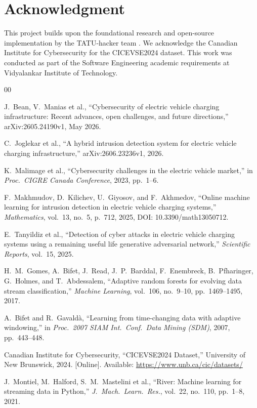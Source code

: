 \documentclass[conference]{IEEEtran}
\begin{document}
\section*{Acknowledgment}

This project builds upon the foundational research and open-source implementation by the TATU-hacker team \cite{b4}. We acknowledge the Canadian Institute for Cybersecurity for the CICEVSE2024 dataset. This work was conducted as part of the Software Engineering academic requirements at Vidyalankar Institute of Technology.

\begin{thebibliography}{00}

 J.\ Bean, V.\ Manias et al., ``Cybersecurity of electric vehicle charging infrastructure: Recent advances, open challenges, and future directions,'' arXiv:2605.24190v1, May 2026.

 C.\ Joglekar et al., ``A hybrid intrusion detection system for electric vehicle charging infrastructure,'' arXiv:2606.23236v1, 2026.

 K.\ Malimage et al., ``Cybersecurity challenges in the electric vehicle market,'' in \emph{Proc.\ CIGRE Canada Conference}, 2023, pp.\ 1--6.

 F.\ Makhmudov, D.\ Kilichev, U.\ Giyosov, and F.\ Akhmedov, ``Online machine learning for intrusion detection in electric vehicle charging systems,'' \emph{Mathematics}, vol.\ 13, no.\ 5, p.\ 712, 2025, DOI: 10.3390/math13050712.

 E.\ Tanyildiz et al., ``Detection of cyber attacks in electric vehicle charging systems using a remaining useful life generative adversarial network,'' \emph{Scientific Reports}, vol.\ 15, 2025.

 H.\ M.\ Gomes, A.\ Bifet, J.\ Read, J.\ P.\ Barddal, F.\ Enembreck, B.\ Pfharinger, G.\ Holmes, and T.\ Abdessalem, ``Adaptive random forests for evolving data stream classification,'' \emph{Machine Learning}, vol.\ 106, no.\ 9--10, pp.\ 1469--1495, 2017.

 A.\ Bifet and R.\ Gavald\`{a}, ``Learning from time-changing data with adaptive windowing,'' in \emph{Proc.\ 2007 SIAM Int.\ Conf.\ Data Mining (SDM)}, 2007, pp.\ 443--448.

 Canadian Institute for Cybersecurity, ``CICEVSE2024 Dataset,'' University of New Brunswick, 2024. [Online]. Available: \url{https://www.unb.ca/cic/datasets/}

 J.\ Montiel, M.\ Halford, S.\ M.\ Mastelini et al., ``River: Machine learning for streaming data in Python,'' \emph{J.\ Mach.\ Learn.\ Res.}, vol.\ 22, no.\ 110, pp.\ 1--8, 2021.

\end{thebibliography}
\end{document}
